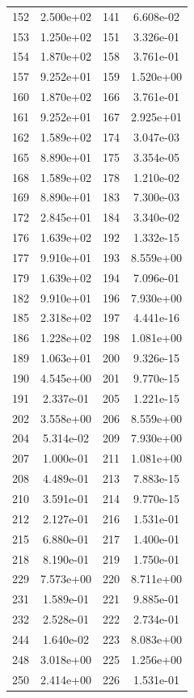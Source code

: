 \documentclass[12pt]{article}
\begin{document}
\begin{longtable}{@{}cccc@{}}
152 & 2.500e+02 & 141 & 6.608e-02 \\
153 & 1.250e+02 & 151 & 3.326e-01 \\
154 & 1.870e+02 & 158 & 3.761e-01 \\
157 & 9.252e+01 & 159 & 1.520e+00 \\
160 & 1.870e+02 & 166 & 3.761e-01 \\
161 & 9.252e+01 & 167 & 2.925e+01 \\
162 & 1.589e+02 & 174 & 3.047e-03 \\
165 & 8.890e+01 & 175 & 3.354e-05 \\
168 & 1.589e+02 & 178 & 1.210e-02 \\
169 & 8.890e+01 & 183 & 7.300e-03 \\
172 & 2.845e+01 & 184 & 3.340e-02 \\
176 & 1.639e+02 & 192 & 1.332e-15 \\
177 & 9.910e+01 & 193 & 8.559e+00 \\
179 & 1.639e+02 & 194 & 7.096e-01 \\
182 & 9.910e+01 & 196 & 7.930e+00 \\
185 & 2.318e+02 & 197 & 4.441e-16 \\
186 & 1.228e+02 & 198 & 1.081e+00 \\
189 & 1.063e+01 & 200 & 9.326e-15 \\
190 & 4.545e+00 & 201 & 9.770e-15 \\
191 & 2.337e-01 & 205 & 1.221e-15 \\
202 & 3.558e+00 & 206 & 8.559e+00 \\
204 & 5.314e-02 & 209 & 7.930e+00 \\
207 & 1.000e-01 & 211 & 1.081e+00 \\
208 & 4.489e-01 & 213 & 7.883e-15 \\
210 & 3.591e-01 & 214 & 9.770e-15 \\
212 & 2.127e-01 & 216 & 1.531e-01 \\
215 & 6.880e-01 & 217 & 1.400e-01 \\
218 & 8.190e-01 & 219 & 1.750e-01 \\
229 & 7.573e+00 & 220 & 8.711e+00 \\
231 & 1.589e-01 & 221 & 9.885e-01 \\
232 & 2.528e-01 & 222 & 2.734e-01 \\
244 & 1.640e-02 & 223 & 8.083e+00 \\
248 & 3.018e+00 & 225 & 1.256e+00 \\
250 & 2.414e+00 & 226 & 1.531e-01 \\

\end{longtable}
\end{document}
